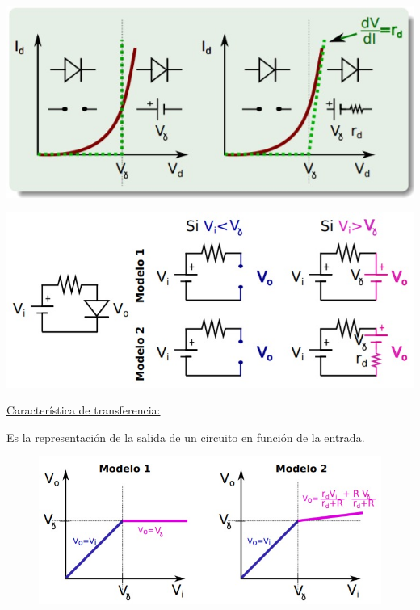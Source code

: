 \documentclass[10pt,a4paper]{article}
\begin{document}
	\begin{minipage}{0.45\linewidth}
		\vspace*{0pt}
		\includegraphics[scale = 0.35]{modelos_1}
	\end{minipage}%
	\begin{minipage}{0.55\linewidth}
		\vspace*{0pt}
		\includegraphics[scale = 0.35]{modelos_2}
	\end{minipage}
	
	\newpage
	\underline{Característica de transferencia:} \newline
	
	Es la representación de la salida de un circuito en función de la entrada.
	
	\begin{figure}[h]
		\centering
		\includegraphics[scale=0.5]{caracteristica_trans}
	\end{figure}
\end{document}
